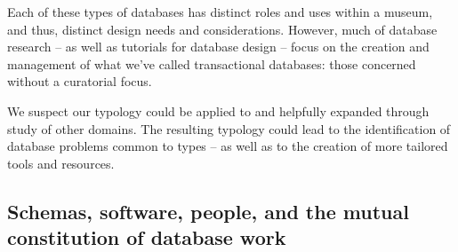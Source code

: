 Each of these types of databases has distinct roles and uses within a museum, and thus, distinct design needs and considerations. However, much of database research -- as well as tutorials for database design -- focus on the creation and management of what we've called transactional databases: those concerned without a curatorial focus. 

We suspect our typology could be applied to and helpfully expanded through study of other domains. The resulting typology could lead to the identification of database problems common to types -- as well as to the creation of more tailored tools and resources.

\subsection{Schemas, software, people, and the mutual constitution of database work}

